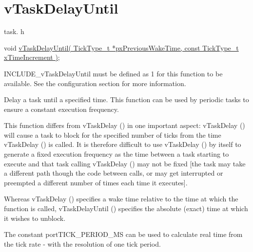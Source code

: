 \hypertarget{group__v_task_delay_until}{}\section{v\+Task\+Delay\+Until}
\label{group__v_task_delay_until}
task. h 
\begin{DoxyPre}void \hyperlink{vendor_2ceedling_2plugins_2freertos_2src_2freertos_2include_2task_8h_a067da3e949e248096ec6c01f9cb75a47}{vTaskDelayUntil( TickType\_t *pxPreviousWakeTime, const TickType\_t xTimeIncrement )};\end{DoxyPre}


I\+N\+C\+L\+U\+D\+E\+\_\+v\+Task\+Delay\+Until must be defined as 1 for this function to be available. See the configuration section for more information.

Delay a task until a specified time. This function can be used by periodic tasks to ensure a constant execution frequency.

This function differs from v\+Task\+Delay () in one important aspect\+: v\+Task\+Delay () will cause a task to block for the specified number of ticks from the time v\+Task\+Delay () is called. It is therefore difficult to use v\+Task\+Delay () by itself to generate a fixed execution frequency as the time between a task starting to execute and that task calling v\+Task\+Delay () may not be fixed \mbox{[}the task may take a different path though the code between calls, or may get interrupted or preempted a different number of times each time it executes\mbox{]}.

Whereas v\+Task\+Delay () specifies a wake time relative to the time at which the function is called, v\+Task\+Delay\+Until () specifies the absolute (exact) time at which it wishes to unblock.

The constant port\+T\+I\+C\+K\+\_\+\+P\+E\+R\+I\+O\+D\+\_\+\+MS can be used to calculate real time from the tick rate -\/ with the resolution of one tick period.


